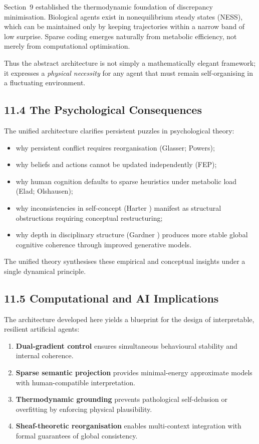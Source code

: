 \documentclass[11pt,a4paper,twoside]{article}
\begin{document}
Section~9 established the thermodynamic foundation of discrepancy minimisation. Biological agents exist in nonequilibrium steady states (NESS), which can be maintained only by keeping trajectories within a narrow band of low surprise. Sparse coding emerges naturally from metabolic efficiency, not merely from computational optimisation.

Thus the abstract architecture is not simply a mathematically elegant framework; it expresses a \emph{physical necessity} for any agent that must remain self-organising in a fluctuating environment.

\subsection*{11.4 The Psychological Consequences}

The unified architecture clarifies persistent puzzles in psychological theory:

\begin{itemize}
\item why persistent conflict requires reorganisation (Glasser; Powers);
\item why beliefs and actions cannot be updated independently (FEP);
\item why human cognition defaults to sparse heuristics under metabolic load (Elad; Olshausen);
\item why inconsistencies in self-concept (Harter \cite{harter1999self}) manifest as structural obstructions requiring conceptual restructuring;
\item why depth in disciplinary structure (Gardner \cite{gardner1999disciplined}) produces more stable global cognitive coherence through improved generative models.
\end{itemize}

The unified theory synthesises these empirical and conceptual insights under a single dynamical principle.

\subsection*{11.5 Computational and AI Implications}

The architecture developed here yields a blueprint for the design of interpretable, resilient artificial agents:

\begin{enumerate}
\item \textbf{Dual-gradient control} ensures simultaneous behavioural stability and internal coherence.
\item \textbf{Sparse semantic projection} provides minimal-energy approximate models with human-compatible interpretation.
\item \textbf{Thermodynamic grounding} prevents pathological self-delusion or overfitting by enforcing physical plausibility.
\item \textbf{Sheaf-theoretic reorganisation} enables multi-context integration with formal guarantees of global consistency.
\end{enumerate}
\end{document}

